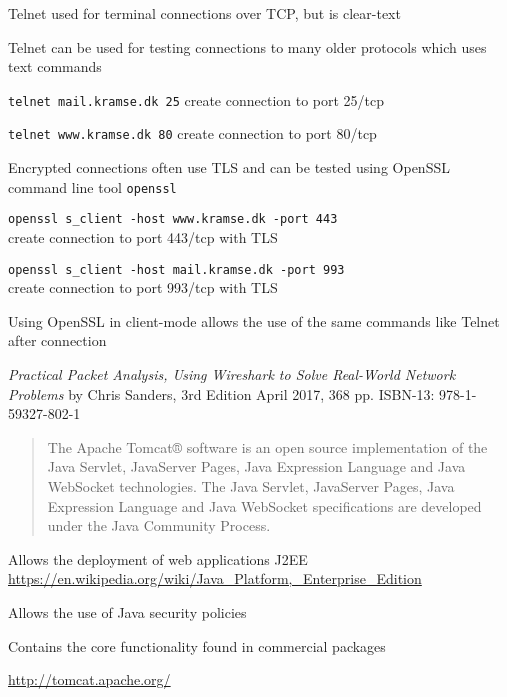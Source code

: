 \documentclass[Screen16to9,17pt]{foils}
\begin{document}
\begin{list1}
\item Telnet used for terminal connections over TCP, but is clear-text
\item Telnet can be used for testing connections to many older protocols which uses text commands
\begin{list2}
\item \verb+telnet mail.kramse.dk 25+ create connection to port 25/tcp
\item \verb+telnet www.kramse.dk 80+ create connection to port 80/tcp
\end{list2}
\item Encrypted connections often use TLS and can be tested using OpenSSL command line tool \verb+openssl+
\begin{list2}
\item \verb+openssl s_client -host www.kramse.dk -port 443+\\
create connection to port 443/tcp with TLS
\item \verb+openssl s_client -host mail.kramse.dk -port 993+\\
create connection to port 993/tcp with TLS
\end{list2}
\item Using OpenSSL in client-mode allows the use of the same commands like Telnet after connection
\end{list1}





\emph{Practical Packet Analysis,
Using Wireshark to Solve Real-World Network Problems}
by Chris Sanders, 3rd Edition
April 2017, 368 pp.
ISBN-13:
978-1-59327-802-1





\begin{quote}
The Apache Tomcat® software is an open source implementation of the Java Servlet, JavaServer Pages, Java Expression Language and Java WebSocket technologies. The Java Servlet, JavaServer Pages, Java Expression Language and Java WebSocket specifications are developed under the Java Community Process.
\end{quote}

\begin{list2}
\item Allows the deployment of web applications J2EE\\ \url{https://en.wikipedia.org/wiki/Java_Platform,_Enterprise_Edition}
\item Allows the use of Java security policies
\item Contains the core functionality found in commercial packages
\item \url{http://tomcat.apache.org/}
\end{list2}
\end{document}
